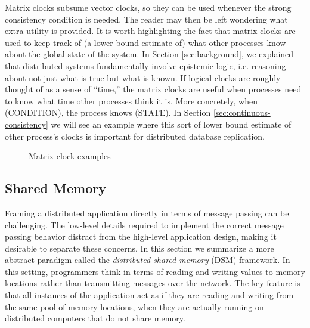 \documentclass[]             %
{NASA}                       %
\theoremstyle{definition}
\begin{document}
Matrix clocks subsume vector clocks, so they can be used whenever the
strong consistency condition is needed. The reader may then be left
wondering what extra utility is provided. It is worth highlighting the
fact that matrix clocks are used to keep track of (a lower bound
estimate of) what other processes know about the global state of the
system. In Section \ref{sec:background}, we explained that distributed
systems fundamentally involve epistemic logic, i.e. reasoning about
not just what is true but what is known. If logical clocks are roughly
thought of as a sense of ``time,'' the matrix clocks are useful when
processes need to know what time other processes think it is. More
concretely, when (CONDITION), the process knows (STATE). In Section
\ref{sec:continuous-consistency} we will see an example where this
sort of lower bound estimate of other process's clocks is important
for distributed database replication.


\begin{figure}[p]
  \setlength\belowcaptionskip{5ex}
  \renewcommand*{\arraystretch}{0.9}

  \begin{subfigure}{1\textwidth}
    \centering
    
    \label{fig:message-latencies-matrix-a}
  \end{subfigure}

  \vspace{4ex}

  \begin{subfigure}{1\textwidth}
    
    \label{fig:message-latencies-matrix-b}
  \end{subfigure}

  \begin{subfigure}{1\textwidth}
    
    \label{fig:message-latencies-matrix-c}
  \end{subfigure}

  \caption{Matrix clock examples}
  \label{fig:message-latencies-matrix}
\end{figure}

\afterpage{\clearpage}



\newpage
\subsection{Shared Memory}
Framing a distributed application directly in terms of message passing
can be challenging. The low-level details required to implement the
correct message passing behavior distract from the high-level
application design, making it desirable to separate these concerns. In
this section we summarize a more abstract paradigm called the
\emph{distributed shared memory} (DSM) framework. In this setting,
programmers think in terms of reading and writing values to memory
locations rather than transmitting messages over the network. The key
feature is that all instances of the application act as if they are
reading and writing from the same pool of memory locations, when they
are actually running on distributed computers that do not share
memory.
\end{document}
